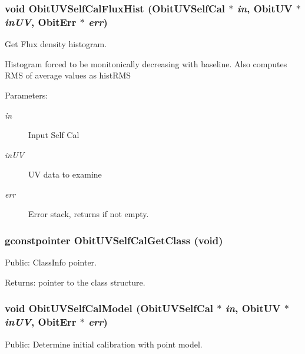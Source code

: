 \subsubsection{\setlength{\rightskip}{0pt plus 5cm}void Obit\-UVSelf\-Cal\-Flux\-Hist ({\bf Obit\-UVSelf\-Cal} $\ast$ {\em in}, {\bf Obit\-UV} $\ast$ {\em in\-UV}, {\bf Obit\-Err} $\ast$ {\em err})}\label{ObitUVSelfCal_8h_a12}


Get Flux density histogram. 

Histogram forced to be monitonically decreasing with baseline. Also computes RMS of average values as hist\-RMS \begin{Desc}
\item[Parameters:]
\begin{description}
\item[{\em in}]Input Self Cal \item[{\em in\-UV}]UV data to examine \item[{\em err}]Error stack, returns if not empty. \end{description}
\end{Desc}
\subsubsection{\setlength{\rightskip}{0pt plus 5cm}gconstpointer Obit\-UVSelf\-Cal\-Get\-Class (void)}\label{ObitUVSelfCal_8h_a7}


Public: Class\-Info pointer. 

\begin{Desc}
\item[Returns:]pointer to the class structure. \end{Desc}
\subsubsection{\setlength{\rightskip}{0pt plus 5cm}void Obit\-UVSelf\-Cal\-Model ({\bf Obit\-UVSelf\-Cal} $\ast$ {\em in}, {\bf Obit\-UV} $\ast$ {\em in\-UV}, {\bf Obit\-Err} $\ast$ {\em err})}\label{ObitUVSelfCal_8h_a11}


Public: Determine initial calibration with point model. 

